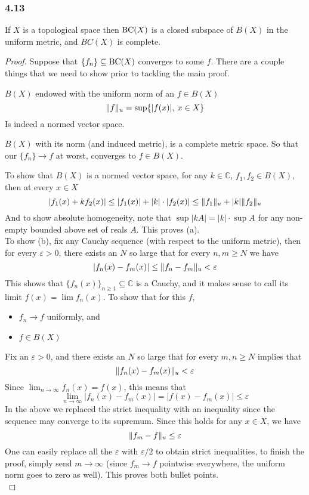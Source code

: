 \documentclass[../../main.tex]{subfiles}
\begin{document}
\subsubsection*{4.13}
\begin{wts}
If $X$ is a topological space then $\operatorname{BC}({X})$ is a closed subspace of $B(X)$ in the uniform metric, and $BC(X)$ is complete.
\end{wts}
\begin{proof}
Suppose that $\{f_n\}\subseteq\operatorname{BC}({X})$ converges to some $f$. There are a couple things that we need to show prior to tackling the main proof.
\begin{enumalpha}
    \item $B(X)$ endowed with the uniform norm of an $f\in B(X)$
    \[
    \lVert {f} \rVert_u = \sup \{|f(x)|,\: x\in X\}
    \]
    Is indeed a normed vector space.
    \item $B(X)$ with its norm (and induced metric), is a complete metric space. So that our $\{f_n\}\to f$ at worst, converges to $f\in B(X)$.
\end{enumalpha}
    To show that $B(X)$ is a normed vector space, for any $k\in \mathbb{C}$, $f_1, f_2\in B(X)$, then at every $x\in X$
    \[
    |f_1(x) + kf_2(x)|\leq |f_1(x)| + |k|\cdot|f_2(x)|\leq \lVert {f_1} \rVert_u + |k|\lVert {f_2} \rVert_u
    \]
    And to show absolute homogeneity, note that $\sup{|kA|} = |k|\cdot\sup{A}$ for any non-empty bounded above set of reals $A$. This proves (a).\\
    
    To show (b), fix any Cauchy sequence (with respect to the uniform metric), then for every $\varepsilon>0$, there exists an $N$ so large that for every $n,m\geq N$ we have
    \[
    |f_n(x)-f_m(x)|\leq \lVert {f_n-f_m} \rVert_u<\varepsilon
    \]
    This shows that $\{f_n(x)\}_{n\geq 1}\subseteq \mathbb{C}$ is a Cauchy, and it makes sense to call its limit $f(x) = \lim f_n(x)$. To show that for this $f$,
    \begin{itemize}
        \item $f_n\to f$ uniformly, and
        \item $f\in B(X)$
    \end{itemize}
    Fix an $\varepsilon>0$, and there exists an $N$ so large that for every $m, n\geq N$ implies that
    \[
    \lVert {f_n(x)-f_m(x)} \rVert_u < \varepsilon
    \]
    Since $\lim_{n\to\infty}f_n(x) = f(x)$, this means that
    \[
    \lim_{n\to\infty}|f_n(x)-f_m(x)|=|f(x)-f_m(x)|\leq\varepsilon
    \]
    In the above we replaced the strict inequality with an inequality since the sequence may converge to its supremum. Since this holds for any $x\in X$, we have
    \[
    \lVert {f_m-f} \rVert_u\leq\varepsilon
    \]
    One can easily replace all the $\varepsilon$ with $\varepsilon/2$ to obtain strict inequalities, to finish the proof, simply send $m\to\infty$ (since $f_m\to f$ pointwise everywhere, the uniform norm goes to zero as well). This proves both bullet points.\\
    

\end{proof}
\end{document}
